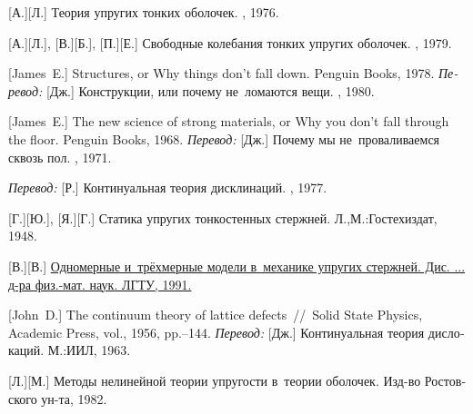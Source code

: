\begin{thebibliography}{123}
\begin{otherlanguage}{russian}
[А.][Л.] Теория упругих тонких оболочек. \naukapublisher, 1976. 

[А.][Л.], [В.][Б.], [П.][Е.] Свободные ко\-леба\-ния тонких упругих оболочек. \naukapublisher, 1979. 

[James~E.] Structures, or Why things don’t fall down. Penguin Books, 1978. 
\emph{Перевод:} [Дж.] Конструкции, или почему не~ломаются вещи. \mirpublisher, 1980. 

[James~E.] The new science of strong materials, or Why you don’t fall through the floor. Penguin Books, 1968. 
\emph{Перевод:} [Дж.] Почему мы не~проваливаемся сквозь пол. \mirpublisher, 1971. 


\emph{Перевод:} [Р.] Континуальная теория дисклинаций. \mirpublisher, 1977. 

[Г.][Ю.], [Я.][Г.] Статика упругих тонкостенных стержней. Л.,\:М.:\;Гостехиздат, 1948. 

[В.][В.] \href{https://www.researchgate.net/publication/320895320_Odnomernye_i_trehmernye_modeli_v_mehanike_uprugih_sterznej}{Одномерные и~трёхмерные модели в~механике упругих стержней. Дис. ... д\hbox{-}ра физ.\hbox{-}мат. наук. ЛГТУ, 1991.} 

[John~D.] The continuum theory of lattice defects~//~Solid State Physics, Academic Press, vol., 1956, pp.\hbox{--}144.
\emph{Перевод:} [Дж.] Континуальная теория дислокаций. М.:\;ИИЛ, 1963. 

[Л.][М.] Методы нелинейной теории упругости в~теории оболочек.
Изд\hbox{-}во Ростовского ун\hbox{-}та, 1982. 


\end{otherlanguage}
\end{thebibliography}
